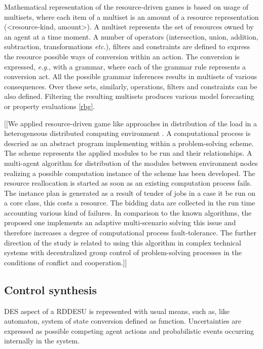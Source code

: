 \documentclass[runningheads]{llncs}
\begin{document}
Mathematical representation of the resource-driven games is based on usage of multisets, where each item of a multiset is an amount of a resource representation (<resource-kind, amount>). A multiset represents the set of resources owned by an agent at a time moment. A number of operators (intersection, union, addition, subtraction, transformations \emph{etc.}), filters and constraints are defined to express the resource possible ways of conversion within an action. The conversion is expressed, \emph{e.g.}, with a grammar, where each of the grammar rule represents a conversion act. All the possible grammar inferences results in multisets of various consequences. Over these sets, similarly, operations, filters and constraints can be also defined. Filtering the resulting multisets produces various model forecasting or property evaluations \ref{rbg}.

[[We applied resource-driven game like approaches in distribution of the load in a heterogeneous distributed computing environment \cite{b1}. A computational process is descried as an abstract program implementing within a problem-solving scheme. The scheme represents the applied modules to be run and their relationships. A multi-agent algorithm for distribution of the modules between environment nodes realizing a possible computation instance of the scheme has been developed. The resource reallocation is started as soon as an existing computation process fails. The instance plan is generated as a result of tender of jobs in a case it be run on a core class, this costs a resource. The bidding data are collected in the run time accounting various kind of failures. In comparison to the known algorithms, the proposed one implements an adaptive multi-scenario solving this issue and therefore increases a degree of computational process fault-tolerance. The further direction of the study is related to using this algorithm in complex technical systems with decentralized group control of problem-solving processes in the conditions of conflict and cooperation.]]

\subsection{Control synthesis}
\label{sec:sub-control-syn}

DES aspect of a RDDESU is represented with usual means, such as, like automaton, system of state conversion defined as function.  Uncertainties are expressed as possible competing agent actions and probabilistic events occurring internally in the system.
\end{document}
